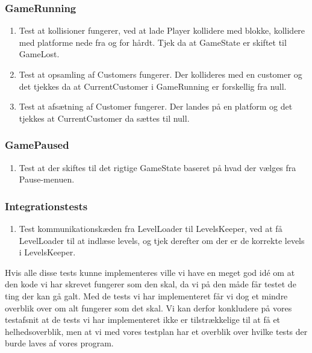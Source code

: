    \subsubsection{GameRunning}
      \begin{enumerate}
         \item Test at kollisioner fungerer, ved at lade Player kollidere med blokke, kollidere med platforme nede fra og for hårdt. Tjek da at GameState er skiftet til GameLost. 
         \item Test at opsamling af Customers fungerer. Der kollideres med en customer og det tjekkes da at CurrentCustomer i GameRunning er forskellig fra null.
         \item Test at afsætning af Customer fungerer. Der landes på en platform og det tjekkes at CurrentCustomer da sættes til null.
      \end{enumerate}
   \subsubsection{GamePaused}
      \begin{enumerate}
         \item Test at der skiftes til det rigtige GameState baseret på hvad der vælges fra Pause-menuen.
      \end{enumerate}
   \subsubsection{Integrationstests}
      \begin{enumerate}
         \item Test kommunikationskæden fra LevelLoader til LevelsKeeper, ved at få LevelLoader til at indlæse levels, og tjek derefter om der er de korrekte levels i LevelsKeeper.
      \end{enumerate}
      Hvis alle disse tests kunne implementeres ville vi have en meget god idé om at den kode vi har skrevet fungerer som den skal, da vi på den måde får testet de ting der kan gå galt. Med de tests vi har implementeret får vi dog et mindre overblik over om alt fungerer som det skal. Vi kan derfor konkludere på vores testafsnit at de tests vi har implementeret ikke er tilstrækkelige til at få et helhedsoverblik, men at vi med vores testplan har et overblik over hvilke tests der burde laves af vores program.
      